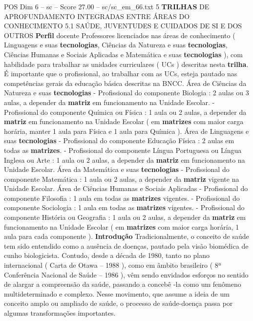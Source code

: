 \begin{textsample}{POS Dim 6 – sc – Score 27.00 – sc/sc\_em\_66.txt}  \label{ex:f6_pos_010}
5 \textbf{TRILHAS} DE APROFUNDAMENTO INTEGRADAS ENTRE ÁREAS DO CONHECIMENTO 5.1 SAÚDE, JUVENTUDES E CUIDADOS DE SI E DOS OUTROS \textbf{Perfil} docente Professores licenciados nas áreas de conhecimento ( Linguagens e suas \textbf{tecnologias}, Ciências da Natureza e suas \textbf{tecnologias}, Ciências Humanas e Sociais Aplicadas e Matemática e suas \textbf{tecnologias} ), com habilidade para trabalhar as unidades curriculares ( UCs ) descritas nesta \textbf{trilha}.
É importante que o profissional, ao trabalhar com as UCs, esteja pautado nas competências gerais da educação básica descritas na BNCC.
Área de Ciências da Natureza e suas \textbf{tecnologias} - Profissional do componente Biologia : 2 aulas ou 3 aulas, a depender da \textbf{matriz} em funcionamento na Unidade Escolar. - Profissional do componente Química ou Física : 1 aula ou 2 aulas, a depender da \textbf{matriz} em funcionamento na Unidade Escolar ( em \textbf{matrizes} com maior carga horária, manter 1 aula para Física e 1 aula para Química ).
Área de Linguagens e suas \textbf{tecnologias} - Profissional do componente Educação Física : 2 aulas em todas as \textbf{matrizes}. - Profissional do componente Língua Portuguesa ou Língua Inglesa ou Arte : 1 aula ou 2 aulas, a depender da \textbf{matriz} em funcionamento na Unidade Escolar.
Área da Matemática e suas \textbf{tecnologias} - Profissional do componente Matemática : 1 aula ou 2 aulas, a depender da \textbf{matriz} vigente na Unidade Escolar.
Área de Ciências Humanas e Sociais Aplicadas - Profissional do componente Filosofia : 1 aula em todas as \textbf{matrizes} vigentes. - Profissional do componente Sociologia : 1 aula em todas as \textbf{matrizes} vigentes. - Profissional do componente História ou Geografia : 1 aula ou 2 aulas, a depender da \textbf{matriz} em funcionamento na Unidade Escolar ( em \textbf{matrizes} com maior carga horária, 1 aula para cada componente ). \textbf{Introdução} Tradicionalmente, o conceito de saúde tem sido entendido como a ausência de doenças, pautado pela visão biomédica de cunho biologicista.
Contudo, desde a década de 1980, tanto no plano internacional ( Carta de Otawa – 1988 ), como em âmbito brasileiro ( 8ª Conferência Nacional de Saúde – 1986 ), vêm sendo envidados esforços no sentido de alargar a compreensão da saúde, passando a concebê -la como um fenômeno multideterminado e complexo.
Nesse movimento, que assume a ideia de um conceito amplo ou ampliado de saúde, o processo de saúde-doença passa por algumas transformações importantes.

\end{textsample}
